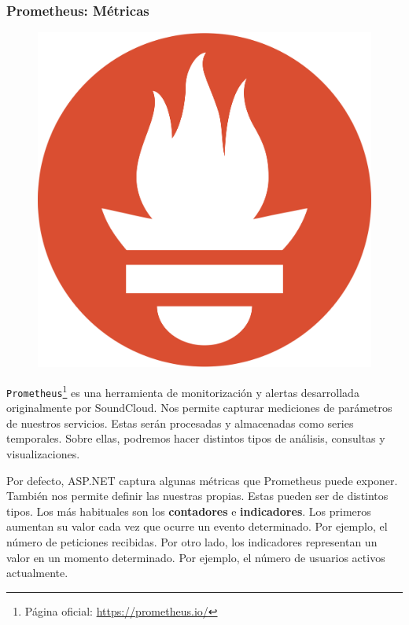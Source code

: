 \subsubsection{Prometheus: Métricas}

\begin{figure}
  \vspace{-12pt}
  \centering
  \includegraphics[scale=0.025]{cap_despliegue/images/prometheus-logo}
\end{figure}

\texttt{Prometheus}\footnote{Página oficial: \url{https://prometheus.io/}} es una herramienta de monitorización y alertas desarrollada originalmente por SoundCloud. Nos permite capturar mediciones de parámetros de nuestros servicios. Estas serán procesadas y almacenadas como series temporales. Sobre ellas, podremos hacer distintos tipos de análisis, consultas y visualizaciones.

Por defecto, ASP.NET captura algunas métricas que Prometheus puede exponer. También nos permite definir las nuestras propias. Estas pueden ser de distintos tipos. Los más habituales son los \textbf{contadores} e \textbf{indicadores}. \cite{parkerDistributedTracingPractice2020} Los primeros aumentan su valor cada vez que ocurre un evento determinado. Por ejemplo, el número de peticiones recibidas. Por otro lado, los indicadores representan un valor en un momento determinado. Por ejemplo, el número de usuarios activos actualmente.

